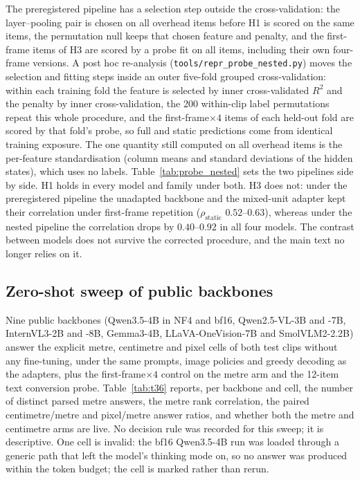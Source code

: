 \documentclass[11pt]{article}
\begin{document}
The preregistered pipeline has a selection step outside the cross-validation:
the layer--pooling pair is chosen on all overhead items before H1 is scored on
the same items, the permutation null keeps that chosen feature and penalty,
and the first-frame items of H3 are scored by a probe fit on all items,
including their own four-frame versions. A post hoc re-analysis
(\texttt{tools/repr\_probe\_nested.py}) moves the selection and fitting
steps inside an outer five-fold grouped cross-validation: within each training
fold the feature is selected by inner cross-validated $R^2$ and the penalty by
inner cross-validation, the 200 within-clip label permutations repeat this
whole procedure, and the first-frame$\times4$ items of each held-out fold are
scored by that fold's probe, so full and static predictions come from
identical training exposure. The one quantity still computed on all overhead
items is the per-feature standardisation (column means and standard
deviations of the hidden states), which uses no labels.
Table~\ref{tab:probe_nested} sets the two pipelines side
by side. H1 holds in every model and family under both. H3 does not: under
the preregistered pipeline the unadapted backbone and the mixed-unit adapter
kept their correlation under first-frame repetition ($\rho_{\mathrm{static}}$
$0.52$--$0.63$), whereas under the nested pipeline the correlation drops by
$0.40$--$0.92$ in all four models. The contrast between models does not
survive the corrected procedure, and the main text no longer relies on it.





\subsection{Zero-shot sweep of public backbones}
\label{supp:t36}

Nine public backbones (Qwen3.5-4B in NF4 and bf16, Qwen2.5-VL-3B and -7B,
InternVL3-2B and -8B, Gemma3-4B, LLaVA-OneVision-7B and SmolVLM2-2.2B) answer
the explicit metre, centimetre and pixel cells of both test clips without
any fine-tuning, under the same prompts, image policies and greedy decoding
as the adapters, plus the first-frame$\times4$ control on the metre arm and
the 12-item text conversion probe. Table~\ref{tab:t36} reports, per
backbone and cell, the number of distinct parsed metre answers, the metre
rank correlation, the paired centimetre/metre and pixel/metre answer ratios,
and whether both the metre and centimetre arms are live. No decision rule
was recorded for this sweep; it is descriptive. One cell is invalid: the bf16
Qwen3.5-4B run was loaded through a generic path that left the model's
thinking mode on, so no answer was produced within the token budget; the
cell is marked rather than rerun.
\end{document}
